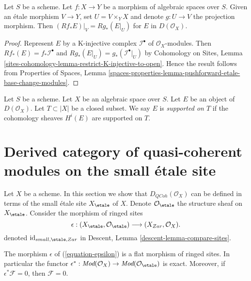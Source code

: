 \begin{lemma}
\label{lemma-restrict-direct-image-open}
Let $S$ be a scheme. Let $f : X \to Y$ be a morphism of algebraic spaces
over $S$. Given an \'etale morphism $V \to Y$, set $U = V \times_Y X$
and denote $g : U \to V$ the projection morphism. Then
$(Rf_*E)|_V = Rg_*(E|_U)$ for $E$ in $D(\mathcal{O}_X)$.
\end{lemma}

\begin{proof}
Represent $E$ by a K-injective complex $\mathcal{I}^\bullet$ of
$\mathcal{O}_X$-modules. Then $Rf_*(E) = f_*\mathcal{I}^\bullet$
and $Rg_*(E|_U) = g_*(\mathcal{I}^\bullet|_U)$ by
Cohomology on Sites, Lemma
\ref{sites-cohomology-lemma-restrict-K-injective-to-open}.
Hence the result follows from
Properties of Spaces,
Lemma \ref{spaces-properties-lemma-pushforward-etale-base-change-modules}.
\end{proof}

\begin{definition}
\label{definition-supported-on}
Let $S$ be a scheme. Let $X$ be an algebraic space over $S$.
Let $E$ be an object of $D(\mathcal{O}_X)$.
Let $T \subset |X|$ be a closed subset.
We say $E$ is {\it supported on $T$} if the
cohomology sheaves $H^i(E)$ are supported on $T$.
\end{definition}








\section{Derived category of quasi-coherent modules on the small \'etale site}
\label{section-derived-quasi-coherent-etale}

\noindent
Let $X$ be a scheme. In this section we show that $D_{QCoh}(\mathcal{O}_X)$
can be defined in terms of the small \'etale site $X_\etale$ of $X$.
Denote $\mathcal{O}_\etale$ the structure sheaf on
$X_\etale$. 
Consider the morphism of ringed sites
\begin{equation}
\label{equation-epsilon}
\epsilon :
(X_\etale, \mathcal{O}_\etale)
\longrightarrow
(X_{Zar}, \mathcal{O}_X).
\end{equation}
denoted $\text{id}_{small, \etale, Zar}$ in
Descent, Lemma \ref{descent-lemma-compare-sites}.

\begin{lemma}
\label{lemma-epsilon-flat}
The morphism $\epsilon$ of (\ref{equation-epsilon})
is a flat morphism of ringed sites. In particular the functor
$\epsilon^* : \textit{Mod}(\mathcal{O}_X) \to
\textit{Mod}(\mathcal{O}_\etale)$ is exact.
Moreover, if $\epsilon^*\mathcal{F} = 0$, then $\mathcal{F} = 0$.
\end{lemma}

